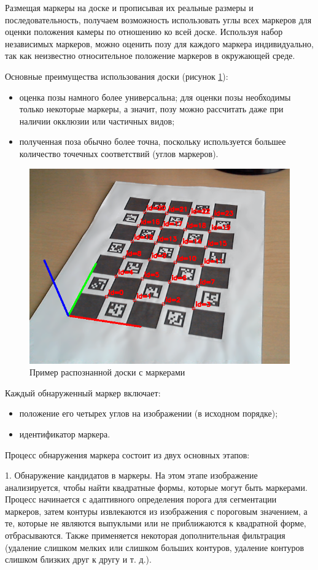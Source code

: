 Размещая маркеры на доске и прописывая их реальные размеры и последовательность, получаем возможность использовать углы всех маркеров для оценки положения камеры по отношению ко всей доске.
Используя набор независимых маркеров, можно оценить позу для каждого маркера индивидуально, так как неизвестно относительное положение маркеров в окружающей среде.

Основные преимущества использования доски (рисунок \ref{fig:aruc}):
\begin{itemize}
\item оценка позы намного более универсальна; для оценки позы необходимы только некоторые маркеры, а значит, позу можно рассчитать даже при наличии окклюзии или частичных видов;
\item полученная поза обычно более точна, поскольку используется большее количество точечных соответствий (углов маркеров).
\end{itemize}
\begin{figure}[H]
	\centering
	\includegraphics[width=0.5\linewidth]{pics/aruc}
	\caption{Пример распознанной доски с маркерами
	}
	\label{fig:aruc}
\end{figure}

Каждый обнаруженный маркер включает:
\begin{itemize}
\item положение его четырех углов на изображении (в исходном порядке);
\item идентификатор маркера.
\end{itemize}

Процесс обнаружения маркера состоит из двух основных этапов:

1. Обнаружение кандидатов в маркеры. На этом этапе изображение анализируется, чтобы найти квадратные формы, которые могут быть маркерами. Процесс начинается с адаптивного определения порога для сегментации маркеров, затем контуры извлекаются из изображения с пороговым значением, а те, которые не являются выпуклыми или не приближаются к квадратной форме, отбрасываются. Также применяется некоторая дополнительная фильтрация (удаление слишком мелких или слишком больших контуров, удаление контуров слишком близких друг к другу и т. д.).

